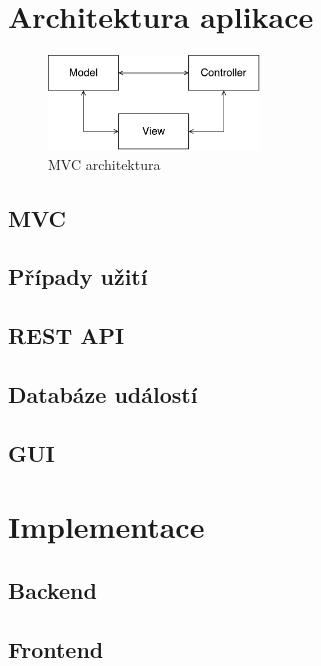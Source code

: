 
\chapter{Architektura aplikace}
\label{architektura}

\begin{figure}[h]
    \centering
    \includegraphics[width=0.5\textwidth]{fig/mvc.pdf}
    \caption{MVC architektura} \label{fig:mvc}
  
\end{figure}

\section{MVC}
\label{sec:mvc}


\section{Případy užití}
\section{REST API}
\label{restapi}
\section{Databáze událostí}
\section{GUI}

\chapter{Implementace}
\section{Backend}
\section{Frontend}
